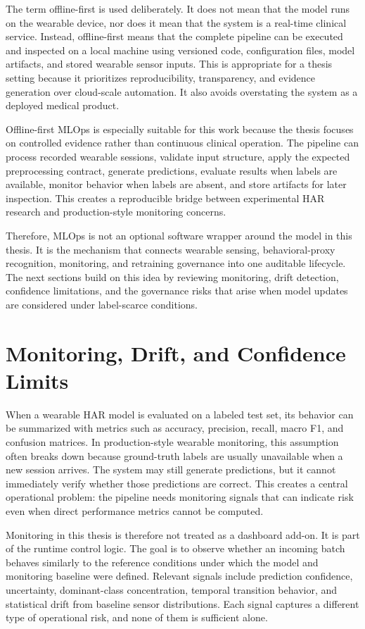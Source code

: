 The term offline-first is used deliberately. It does not mean that the model runs on the wearable device, nor does it mean that the system is a real-time clinical service. Instead, offline-first means that the complete pipeline can be executed and inspected on a local machine using versioned code, configuration files, model artifacts, and stored wearable sensor inputs. This is appropriate for a thesis setting because it prioritizes reproducibility, transparency, and evidence generation over cloud-scale automation. It also avoids overstating the system as a deployed medical product.

Offline-first MLOps is especially suitable for this work because the thesis focuses on controlled evidence rather than continuous clinical operation. The pipeline can process recorded wearable sessions, validate input structure, apply the expected preprocessing contract, generate predictions, evaluate results when labels are available, monitor behavior when labels are absent, and store artifacts for later inspection. This creates a reproducible bridge between experimental HAR research and production-style monitoring concerns.

Therefore, MLOps is not an optional software wrapper around the model in this thesis. It is the mechanism that connects wearable sensing, behavioral-proxy recognition, monitoring, and retraining governance into one auditable lifecycle. The next sections build on this idea by reviewing monitoring, drift detection, confidence limitations, and the governance risks that arise when model updates are considered under label-scarce conditions.

\section{Monitoring, Drift, and Confidence Limits}

When a wearable HAR model is evaluated on a labeled test set, its behavior can be summarized with metrics such as accuracy, precision, recall, macro F1, and confusion matrices. In production-style wearable monitoring, this assumption often breaks down because ground-truth labels are usually unavailable when a new session arrives. The system may still generate predictions, but it cannot immediately verify whether those predictions are correct. This creates a central operational problem: the pipeline needs monitoring signals that can indicate risk even when direct performance metrics cannot be computed.

Monitoring in this thesis is therefore not treated as a dashboard add-on. It is part of the runtime control logic. The goal is to observe whether an incoming batch behaves similarly to the reference conditions under which the model and monitoring baseline were defined. Relevant signals include prediction confidence, uncertainty, dominant-class concentration, temporal transition behavior, and statistical drift from baseline sensor distributions. Each signal captures a different type of operational risk, and none of them is sufficient alone.

